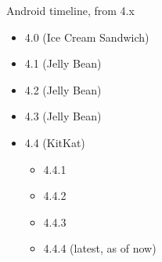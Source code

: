 \documentclass{beamer}
\begin{document}
\begin{frame}{Android timeline, from 4.x}
\begin{itemize}
 \item 4.0 (Ice Cream Sandwich)
  \item 4.1 (Jelly Bean)
  \item 4.2  (Jelly Bean)
  \item 4.3  (Jelly Bean)
  \item 4.4 (KitKat)
  \begin{itemize}
   \item 4.4.1
   \item 4.4.2
   \item 4.4.3
   \item 4.4.4 (latest, as of now)
  \end{itemize}

\end{itemize}

 
\end{frame}
\end{document}
